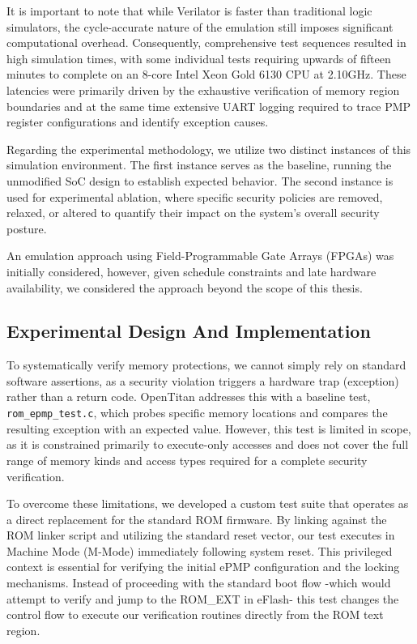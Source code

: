 \documentclass[10pt,a4paper,twocolumn,twoside]{article}
\begin{document}
It is important to note that while Verilator is faster than traditional logic simulators, the cycle-accurate nature of the emulation still imposes significant computational overhead. Consequently, comprehensive test sequences resulted in high simulation times, with some individual tests requiring upwards of fifteen minutes to complete on an 8-core Intel Xeon Gold 6130 CPU at 2.10GHz. These latencies were primarily driven by the exhaustive verification of memory region boundaries and at the same time extensive UART logging required to trace PMP register configurations and identify exception causes.

Regarding the experimental methodology, we utilize two distinct instances of this simulation environment. The first instance serves as the baseline, running the unmodified SoC design to establish expected behavior. The second instance is used for experimental ablation, where specific security policies are removed, relaxed, or altered to quantify their impact on the system's overall security posture.

An emulation approach using Field-Programmable Gate Arrays (FPGAs) was initially considered, however, given schedule constraints and late hardware availability, we considered the approach beyond the scope of this thesis.

\subsection{Experimental Design And Implementation}
To systematically verify memory protections, we cannot simply rely on standard software assertions, as a security violation triggers a hardware trap (exception) rather than a return code. OpenTitan addresses this with a baseline test, \texttt{rom\_epmp\_test.c}, which probes specific memory locations and compares the resulting exception with an expected value. However, this test is limited in scope, as it is constrained primarily to execute-only accesses and does not cover the full range of memory kinds and access types required for a complete security verification.

To overcome these limitations, we developed a custom test suite that operates as a direct replacement for the standard ROM firmware. By linking against the ROM linker script and utilizing the standard reset vector, our test executes in Machine Mode (M-Mode) immediately following system reset. This privileged context is essential for verifying the initial ePMP configuration and the locking mechanisms. Instead of proceeding with the standard boot flow -which would attempt to verify and jump to the ROM\_EXT in eFlash- this test changes the control flow to execute our verification routines directly from the ROM text region.
\end{document}
